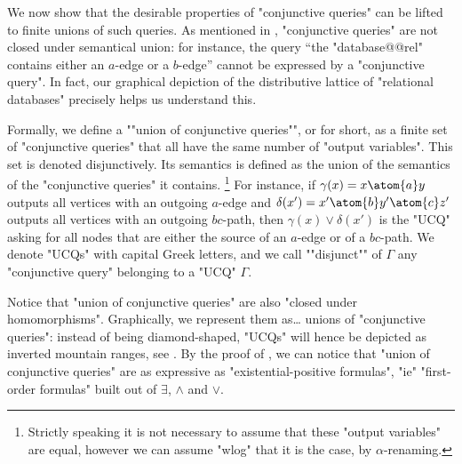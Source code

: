 We now show that the desirable properties of "conjunctive queries" can be
lifted to finite unions of such queries.
As mentioned in , "conjunctive queries"
are not closed under semantical union: for instance,
the query ``the "database@@rel" contains either an $a$-edge or a $b$-edge''
cannot be expressed by a "conjunctive query".
In fact, our graphical depiction of the distributive lattice of "relational databases"
precisely helps us understand this.

Formally, we define a ""union of conjunctive queries"", or  for short,
as a finite set of "conjunctive queries" that all have the same number
of "output variables". This set is denoted disjunctively.
Its semantics is defined as the union of the semantics of the "conjunctive queries" it contains.%
\footnote[][2em]{Strictly speaking it is not necessary
to assume that these "output variables" are equal, however we can assume "wlog" that
it is the case, by $\alpha$-renaming.}
For instance, if $\gamma(x) = x \atom{a} y$ outputs all vertices
with an outgoing $a$-edge and $\delta(x') = x' \atom{b} y' \atom{c} z'$
outputs all vertices with an outgoing $bc$-path, then
$\gamma(x) \lor \delta(x')$ is the "UCQ" asking for all nodes
that are either the source of an $a$-edge or of a $bc$-path.
We denote "UCQs" with capital Greek letters,
and \AP we call ""disjunct"" of $\Gamma$ any "conjunctive query" belonging to a
"UCQ" $\Gamma$.

Notice that "union of conjunctive queries" are also "closed under homomorphisms".
Graphically, we represent them as… unions of "conjunctive queries":
instead of being diamond-shaped, "UCQs" will hence be depicted
as inverted mountain ranges, see .
By the proof of , we can notice that "union of conjunctive queries"
are as expressive as "existential-positive formulas", "ie" "first-order formulas"
built out of $\exists$, $\land$ and $\lor$.

